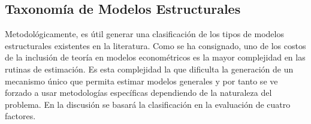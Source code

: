 \documentclass[
]{book}
\begin{document}
\hypertarget{taxonomuxeda-de-modelos-estructurales}{%
\subsection{Taxonomía de Modelos Estructurales}\label{taxonomuxeda-de-modelos-estructurales}}

Metodológicamente, es útil generar una clasificación de los tipos de modelos estructurales existentes en la literatura. Como se ha consignado, uno de los costos de la inclusión de teoría en modelos econométricos es la mayor complejidad en las rutinas de estimación. Es esta complejidad la que dificulta la generación de un mecanismo único que permita estimar modelos generales y por tanto se ve forzado a usar metodologías específicas dependiendo de la naturaleza del problema. En la discusión se basará la clasificación en la evaluación de cuatro factores.
\end{document}
